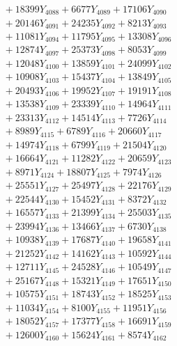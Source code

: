 \documentclass[a4paper,10pt]{article}
\begin{document}
{\begin{align}
&\;  + 18399 Y_{4088} + 6677 Y_{4089} + 17106 Y_{4090} \\[0.3ex]
&\;  + 20146 Y_{4091} + 24235 Y_{4092} + 8213 Y_{4093} \\[0.3ex]
&\;  + 11081 Y_{4094} + 11795 Y_{4095} + 13308 Y_{4096} \\[0.3ex]
&\;  + 12874 Y_{4097} + 25373 Y_{4098} + 8053 Y_{4099} \\[0.3ex]
&\;  + 12048 Y_{4100} + 13859 Y_{4101} + 24099 Y_{4102} \\[0.3ex]
&\;  + 10908 Y_{4103} + 15437 Y_{4104} + 13849 Y_{4105} \\[0.3ex]
&\;  + 20493 Y_{4106} + 19952 Y_{4107} + 19191 Y_{4108} \\[0.5ex]\allowbreak
&\;  + 13538 Y_{4109} + 23339 Y_{4110} + 14964 Y_{4111} \\[0.3ex]
&\;  + 23313 Y_{4112} + 14514 Y_{4113} + 7726 Y_{4114} \\[0.3ex]
&\;  + 8989 Y_{4115} + 6789 Y_{4116} + 20660 Y_{4117} \\[0.3ex]
&\;  + 14974 Y_{4118} + 6799 Y_{4119} + 21504 Y_{4120} \\[0.3ex]
&\;  + 16664 Y_{4121} + 11282 Y_{4122} + 20659 Y_{4123} \\[0.3ex]
&\;  + 8971 Y_{4124} + 18807 Y_{4125} + 7974 Y_{4126} \\[0.3ex]
&\;  + 25551 Y_{4127} + 25497 Y_{4128} + 22176 Y_{4129} \\[0.3ex]
&\;  + 22544 Y_{4130} + 15452 Y_{4131} + 8372 Y_{4132} \\[0.3ex]
&\;  + 16557 Y_{4133} + 21399 Y_{4134} + 25503 Y_{4135} \\[0.3ex]
&\;  + 23994 Y_{4136} + 13466 Y_{4137} + 6730 Y_{4138} \\[0.5ex]\allowbreak
&\;  + 10938 Y_{4139} + 17687 Y_{4140} + 19658 Y_{4141} \\[0.3ex]
&\;  + 21252 Y_{4142} + 14162 Y_{4143} + 10592 Y_{4144} \\[0.3ex]
&\;  + 12711 Y_{4145} + 24528 Y_{4146} + 10549 Y_{4147} \\[0.3ex]
&\;  + 25167 Y_{4148} + 15321 Y_{4149} + 17651 Y_{4150} \\[0.3ex]
&\;  + 10575 Y_{4151} + 18743 Y_{4152} + 18525 Y_{4153} \\[0.3ex]
&\;  + 11034 Y_{4154} + 8100 Y_{4155} + 11951 Y_{4156} \\[0.3ex]
&\;  + 18052 Y_{4157} + 17377 Y_{4158} + 16691 Y_{4159} \\[0.3ex]
&\;  + 12600 Y_{4160} + 15624 Y_{4161} + 8574 Y_{4162} \\[0.3ex]

\end{align}}
\end{document}
